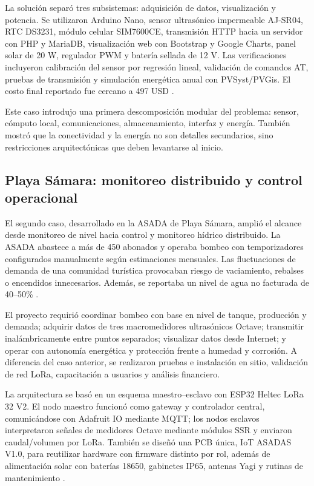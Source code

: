 \documentclass[conference]{IEEEtran}
\begin{document}
La solución separó tres subsistemas: adquisición de datos, visualización y potencia. Se utilizaron Arduino Nano, sensor ultrasónico impermeable AJ-SR04, RTC DS3231, módulo celular SIM7600CE, transmisión HTTP hacia un servidor con PHP y MariaDB, visualización web con Bootstrap y Google Charts, panel solar de 20 W, regulador PWM y batería sellada de 12 V. Las verificaciones incluyeron calibración del sensor por regresión lineal, validación de comandos AT, pruebas de transmisión y simulación energética anual con PVSyst/PVGis. El costo final reportado fue cercano a 497 USD \cite{Chavarria2021}.

Este caso introdujo una primera descomposición modular del problema: sensor, cómputo local, comunicaciones, almacenamiento, interfaz y energía. También mostró que la conectividad y la energía no son detalles secundarios, sino restricciones arquitectónicas que deben levantarse al inicio.

\subsection{Playa Sámara: monitoreo distribuido y control operacional}
El segundo caso, desarrollado en la ASADA de Playa Sámara, amplió el alcance desde monitoreo de nivel hacia control y monitoreo hídrico distribuido. La ASADA abastece a más de 450 abonados y operaba bombeo con temporizadores configurados manualmente según estimaciones mensuales. Las fluctuaciones de demanda de una comunidad turística provocaban riesgo de vaciamiento, rebalses o encendidos innecesarios. Además, se reportaba un nivel de agua no facturada de 40--50\% \cite{Solorzano2021}.

El proyecto requirió coordinar bombeo con base en nivel de tanque, producción y demanda; adquirir datos de tres macromedidores ultrasónicos Octave; transmitir inalámbricamente entre puntos separados; visualizar datos desde Internet; y operar con autonomía energética y protección frente a humedad y corrosión. A diferencia del caso anterior, se realizaron pruebas e instalación en sitio, validación de red LoRa, capacitación a usuarios y análisis financiero.

La arquitectura se basó en un esquema maestro--esclavo con ESP32 Heltec LoRa 32 V2. El nodo maestro funcionó como gateway y controlador central, comunicándose con Adafruit IO mediante MQTT; los nodos esclavos interpretaron señales de medidores Octave mediante módulos SSR y enviaron caudal/volumen por LoRa. También se diseñó una PCB única, IoT ASADAS V1.0, para reutilizar hardware con firmware distinto por rol, además de alimentación solar con baterías 18650, gabinetes IP65, antenas Yagi y rutinas de mantenimiento \cite{Solorzano2021}.
\end{document}
